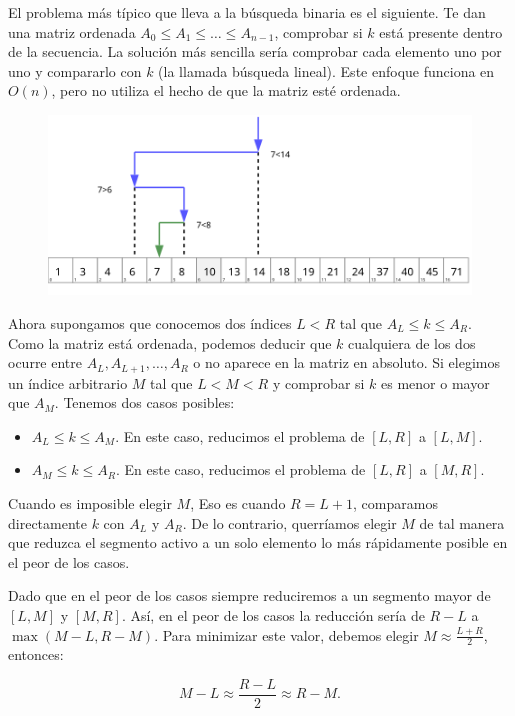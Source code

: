 El problema más típico que lleva a la búsqueda binaria es el siguiente. Te dan una matriz ordenada $A_0 \leq A_1 \leq \dots \leq A_{n-1}$, comprobar si $k$ está presente dentro de la secuencia. La solución más sencilla sería comprobar cada elemento uno por uno y compararlo con $k$ (la llamada búsqueda lineal). Este enfoque funciona en $O(n)$, pero no utiliza el hecho de que la matriz esté ordenada.

\begin{figure}[h!]
	\centering
	\includegraphics[width=0.7\linewidth]{img/Binary_Search_Depiction}
	\label{fig:binarysearchdepiction}
\end{figure}

Ahora supongamos que conocemos dos índices $L <R$ tal que $A_L \leq k \leq A_R$. Como la matriz está ordenada, podemos deducir que $k$ cualquiera de los dos ocurre entre $A_L, A_{L+1}, \dots, A_R$ o no aparece en la matriz en absoluto. Si elegimos un índice arbitrario $M$ tal que $L <M <R$ y comprobar si $k$ es menor o mayor que $A_M$. Tenemos dos casos posibles:

\begin{itemize}
	\item $A_L \leq k \leq A_M$. En este caso, reducimos el problema de $[L, R]$ a $[L,M]$.
	\item $A_M \leq k \leq A_R$. En este caso, reducimos el problema de $[L, R]$ a $[M,R]$.
\end{itemize}

Cuando es imposible elegir $M$, Eso es cuando $R = L + 1$, comparamos directamente $k$ con $A_L$ y $A_R$. De lo contrario, querríamos elegir $M$ de tal manera que reduzca el segmento activo a un solo elemento lo más rápidamente posible en el peor de los casos.

Dado que en el peor de los casos siempre reduciremos a un segmento mayor de $[L,M]$ y $[M,R]$. Así, en el peor de los casos la reducción sería de $R-L$ a $\max(M-L, R-M)$. Para minimizar este valor, debemos elegir $M \approx \frac{L+R}{2}$, entonces:

$$M-L \approx \frac{R-L}{2} \approx R-M.$$

